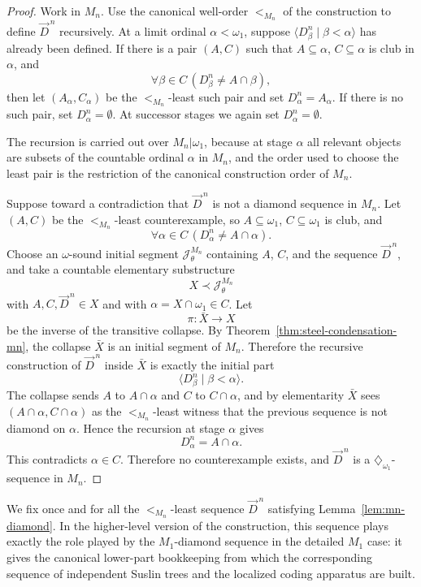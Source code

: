 \documentclass[a4paper,11pt]{article}
\begin{document}
\begin{proof}
Work in $M_n$.  Use the canonical well-order $<_{M_n}$ of the construction to define $\vec D^{\,n}$ recursively.  At a limit ordinal $\alpha<\omega_1$, suppose $\langle D^n_\beta\mid\beta<\alpha\rangle$ has already been defined.  If there is a pair $(A,C)$ such that $A\subseteq\alpha$, $C\subseteq\alpha$ is club in $\alpha$, and
\[
   \forall\beta\in C\,(D^n_\beta\neq A\cap\beta),
\]
then let $(A_\alpha,C_\alpha)$ be the $<_{M_n}$-least such pair and set $D^n_\alpha=A_\alpha$.  If there is no such pair, set $D^n_\alpha=\emptyset$.  At successor stages we again set $D^n_\alpha=\emptyset$.

The recursion is carried out over $M_n|\omega_1$, because at stage $\alpha$ all relevant objects are subsets of the countable ordinal $\alpha$ in $M_n$, and the order used to choose the least pair is the restriction of the canonical construction order of $M_n$.

Suppose toward a contradiction that $\vec D^{\,n}$ is not a diamond sequence in $M_n$.  Let $(A,C)$ be the $<_{M_n}$-least counterexample, so $A\subseteq\omega_1$, $C\subseteq\omega_1$ is club, and
\[
   \forall\alpha\in C\,(D^n_\alpha\neq A\cap\alpha).
\]
Choose an $\omega$-sound initial segment $\mathcal J^{M_n}_\theta$ containing $A$, $C$, and the sequence $\vec D^{\,n}$, and take a countable elementary substructure
\[
   X\prec \mathcal J^{M_n}_\theta
\]
with $A,C,\vec D^{\,n}\in X$ and with $\alpha=X\cap\omega_1\in C$.  Let
\[
   \pi:\bar X\rightarrow X
\]
be the inverse of the transitive collapse.  By Theorem~\ref{thm:steel-condensation-mn}, the collapse $\bar X$ is an initial segment of $M_n$.  Therefore the recursive construction of $\vec D^{\,n}$ inside $\bar X$ is exactly the initial part
\[
   \langle D^n_\beta\mid\beta<\alpha\rangle.
\]
The collapse sends $A$ to $A\cap\alpha$ and $C$ to $C\cap\alpha$, and by elementarity $\bar X$ sees $(A\cap\alpha,C\cap\alpha)$ as the $<_{M_n}$-least witness that the previous sequence is not diamond on $\alpha$.  Hence the recursion at stage $\alpha$ gives
\[
   D^n_\alpha=A\cap\alpha.
\]
This contradicts $\alpha\in C$.  Therefore no counterexample exists, and $\vec D^{\,n}$ is a $\diamondsuit_{\omega_1}$-sequence in $M_n$.
\end{proof}

We fix once and for all the $<_{M_n}$-least sequence $\vec D^{\,n}$ satisfying Lemma~\ref{lem:mn-diamond}.  In the higher-level version of the construction, this sequence plays exactly the role played by the $M_1$-diamond sequence in the detailed $M_1$ case: it gives the canonical lower-part bookkeeping from which the corresponding sequence of independent Suslin trees and the localized coding apparatus are built.
\end{document}
